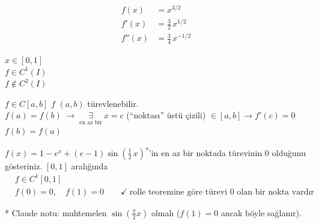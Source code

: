 \documentclass[11pt,a4paper]{article}
\begin{document}
\begin{ornek}
\noindent
\begin{minipage}[t]{0.55\linewidth}
\begin{align*}
  f(x) &= x^{3/2}\\
  f'(x) &= \frac{3}{2}\,x^{1/2}\\
  f''(x) &= \frac{3}{4}\,x^{-1/2}
\end{align*}
\end{minipage}\hfill
\begin{minipage}[t]{0.4\linewidth}
$x \in [0,1]$\\[4mm]
$f \in C^1(I)$\\[2mm]
$f \notin C^2(I)$
\end{minipage}
\end{ornek}

\noindent
\begin{minipage}[c]{0.66\linewidth}
\begin{teorem}
$f \in C[a,b]$ \qquad $f$ $(a,b)$ türevlenebilir.\\[1mm]
$f(a) = f(b) \;\rightarrow\; \underset{\text{en az bir}}{\exists}\ x = c$ {\small(``noktası'' üstü çizili)} $\in [a,b] \rightarrow f'(c) = 0$
\hfill{\small $f(b) = f(a)$}
\end{teorem}
\end{minipage}\hfill
\begin{minipage}[c]{0.3\linewidth}
\centering
{}
\end{minipage}

\begin{ornek}
$f(x) = 1 - e^x + (e-1)\sin\left(\frac{1}{2}\,x\right)$\textsuperscript{*}'in en az bir noktada türevinin 0 olduğunu
gösteriniz. $[0,1]$ aralığında
\begin{align*}
  & f \in C^1[0,1]\\
  & f(0) = 0, \quad f(1) = 0 \qquad \checkmark\ \text{rolle teoremine göre türevi 0 olan bir nokta vardır}
\end{align*}
{\footnotesize\color{kursunkalem}* Claude notu: muhtemelen $\sin\left(\frac{\pi}{2}x\right)$ olmalı ($f(1) = 0$ ancak böyle sağlanır).\par}
\end{ornek}
\end{document}
